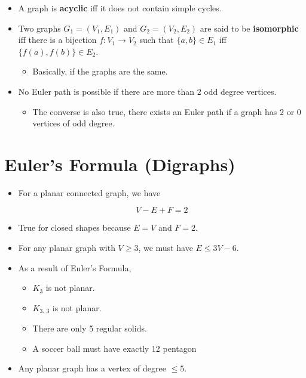 \documentclass[12pt]{scrartcl}
\begin{document}
\begin{itemize}
    \item A graph is \textbf{acyclic} iff it does not contain simple cycles.
    \item Two graphs $G_1 = (V_1, E_1)$ and $G_2 = (V_2, E_2)$ are said to be \textbf{isomorphic} iff there is a bijection $f: V_1 \rightarrow V_2$ such that $\{a, b\} \in E_1$ iff $\{f(a), f(b)\} \in E_2$.
        \begin{itemize}
            \item Basically, if the graphs are the same.
        \end{itemize}

    \item No Euler path is possible if there are more than $2$ odd degree vertices.
        \begin{itemize}
            \item The converse is also true, there exists an Euler path if a graph has $2$ or $0$ vertices of odd degree.
        \end{itemize}
\end{itemize}


\section{Euler's Formula (Digraphs)}
\begin{itemize}
    \item For a planar connected graph, we have

        \begin{equation*}
            V - E + F = 2
        \end{equation*}

    \item True for closed shapes because $E = V$ and $F = 2$.
    \item For any planar graph with $V \geq 3$, we must have $E \leq 3V - 6$.
    \item As a result of Euler's Formula,
        \begin{itemize}
            \item $K_3$ is not planar.
            \item $K_{3,\, 3}$ is not planar.
            \item There are only 5 regular solids.
            \item A soccer ball must have exactly \num{12} pentagon
        \end{itemize}

    \item Any planar graph has a vertex of degree $\leq 5$.
\end{itemize}
\end{document}
